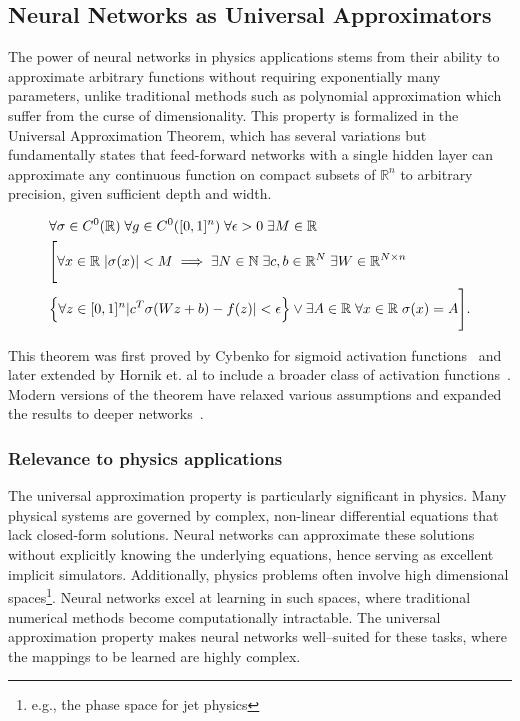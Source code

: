     \subsection{Neural Networks as Universal Approximators}
        The power of neural networks in physics applications stems from their ability to approximate arbitrary functions without requiring exponentially many parameters, unlike traditional methods such as polynomial approximation which suffer from the curse of dimensionality.
        This property is formalized in the Universal Approximation Theorem, which has several variations but fundamentally states that feed-forward networks with a single hidden layer can approximate any continuous function on compact subsets of \(\mathbb{R}^n\) to arbitrary precision, given sufficient depth and width.
        \begin{theorem}
        \begin{align}
            &\forall \sigma\in C^0(\mathbb{R})\; \forall g\in C^0([0, 1]^n)\;\forall\epsilon > 0\;\exists M\in \mathbb{R}\\
            &\Bigg[\forall x\in\mathbb{R}\;|\sigma(x)| < M\implies \exists N\in\mathbb{N}\;\exists c, b\in \mathbb{R}^N\;\exists W\in \mathbb{R}^{N\times n}\\
            &\Big\{\forall z\in[0, 1]^n |c^T\sigma(Wz + b) - f(z)|<\epsilon\Big\} \lor \exists A\in\mathbb{R}\;\forall x\in\mathbb{R}\;\sigma(x) = A\Bigg].
            \end{align}
        \end{theorem}
        This theorem was first proved by Cybenko for sigmoid activation functions~\cite{cybenko_approximation_1989} and later extended by Hornik et. al to include a broader class of activation functions~\cite{hornik_multilayer_1989}. Modern versions of the theorem have relaxed various assumptions and expanded the results to deeper networks~\cite{augustine_survey_2024}.
        \subsubsection{Relevance to physics applications}
            The universal approximation property is particularly significant in physics.
            Many physical systems are governed by complex, non-linear differential equations that lack closed-form solutions.
            Neural networks can approximate these solutions without explicitly knowing the underlying equations, hence serving as excellent implicit simulators.
            Additionally, physics problems often involve high dimensional spaces\footnote{e.g., the phase space for jet physics}.
            Neural networks excel at learning in such spaces, where traditional numerical methods become computationally intractable.
            The universal approximation property makes neural networks well--suited for these tasks, where the mappings to be learned are highly complex.

